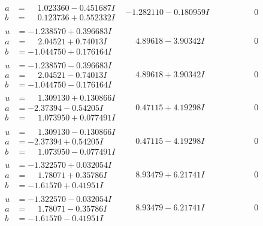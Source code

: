 \documentclass[1p]{elsarticle_modified}
\theoremstyle{definition}
\begin{document}
$$\begin{array}{c|c|c}
\begin{aligned}
a &= \phantom{-}1.023360 - 0.451687 I \\
b &= \phantom{-}0.123736 + 0.552332 I\end{aligned}
 & -1.282110 - 0.180959 I & \phantom{-0.000000 } 0 \\ \hline\begin{aligned}
u &= -1.238570 + 0.396683 I \\
a &= \phantom{-}2.04521 + 0.74013 I \\
b &= -1.044750 + 0.176164 I\end{aligned}
 & \phantom{-}4.89618 - 3.90342 I & \phantom{-0.000000 } 0 \\ \hline\begin{aligned}
u &= -1.238570 - 0.396683 I \\
a &= \phantom{-}2.04521 - 0.74013 I \\
b &= -1.044750 - 0.176164 I\end{aligned}
 & \phantom{-}4.89618 + 3.90342 I & \phantom{-0.000000 } 0 \\ \hline\begin{aligned}
u &= \phantom{-}1.309130 + 0.130866 I \\
a &= -2.37394 - 0.54205 I \\
b &= \phantom{-}1.073950 + 0.077491 I\end{aligned}
 & \phantom{-}0.47115 + 4.19298 I & \phantom{-0.000000 } 0 \\ \hline\begin{aligned}
u &= \phantom{-}1.309130 - 0.130866 I \\
a &= -2.37394 + 0.54205 I \\
b &= \phantom{-}1.073950 - 0.077491 I\end{aligned}
 & \phantom{-}0.47115 - 4.19298 I & \phantom{-0.000000 } 0 \\ \hline\begin{aligned}
u &= -1.322570 + 0.032054 I \\
a &= \phantom{-}1.78071 + 0.35786 I \\
b &= -1.61570 + 0.41951 I\end{aligned}
 & \phantom{-}8.93479 + 6.21741 I & \phantom{-0.000000 } 0 \\ \hline\begin{aligned}
u &= -1.322570 - 0.032054 I \\
a &= \phantom{-}1.78071 - 0.35786 I \\
b &= -1.61570 - 0.41951 I\end{aligned}
 & \phantom{-}8.93479 - 6.21741 I & \phantom{-0.000000 } 0 \\ \hline\begin{aligned}

\end{aligned}
\end{array}$$
\end{document}
